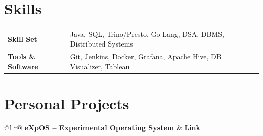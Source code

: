\documentclass[a4paper,12pt]{article}
\begin{document}
\section{Skills}
\begin{tabularx}{\linewidth}{@{}l X@{}}
\textbf{Skill Set} & Java, SQL, Trino/Presto, Go Lang, DSA, DBMS, Distributed Systems \\
\textbf{Tools \& Software} & Git, Jenkins, Docker, Grafana, Apache Hive, DB Visualizer, Tableau \\
\end{tabularx}


\section{Personal Projects}

\begin{tabularx}{\linewidth}{ @{}l r@{} }
\textbf{eXpOS – Experimental Operating System} & \hfill \href{https://github.com/vishnu-lab/eXpOS}{\textbf{Link}} \\[3.75pt]
  \\
\end{tabularx}

\vfill
\end{document}
